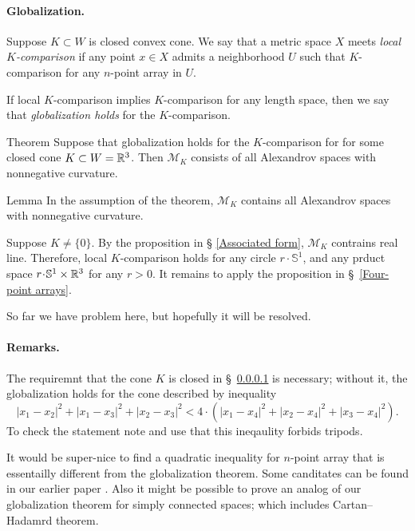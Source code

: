 \documentclass[a4paper,10pt]{article}
\begin{document}
\paragraph{Globalization.}\label{par:globalization}
Suppose $K\subset W$ is closed convex cone.
We say that a metric space $X$ meets \emph{local $K$-comparison} if any point $x\in X$ admits a neighborhood $U$ such that $K$-comparison for any $n$-point array in $U$.

If local $K$-comparison implies $K$-comparison for any length space, then we say that \emph{globalization holds} for the $K$-comparison.

\begin{thm}{Theorem}
Suppose that globalization holds for the $K$-comparison for for some closed cone $K\subset W=\mathbb{R}^3$.
Then $\mathcal{M}_K$ consists of all Alexandrov spaces with nonnegative curvature.
\end{thm}

\begin{thm}{Lemma}
In the assumption of the theorem, $\mathcal{M}_K$ contains all Alexandrov spaces with nonnegative curvature.
\end{thm}

Suppose $K\ne\{0\}$.
By the proposition in § \ref{Associated form}, $\mathcal{M}_K$ contrains real line.
Therefore, local $K$-comparison holds for any circle $r\cdot \mathbb{S}^1$, and any prduct space $r\cdot \mathbb{S}^1\times\RR^3$ for any $r>0$.
It remains to apply the proposition in §~\ref{Four-point arrays}.
\qeds

So far we have problem here, but hopefully it will be resolved.
\qeds

\paragraph{Remarks.}
The requiremnt that the cone $K$ is closed in §~\ref{par:globalization} is necessary;
without it, the globalization holds for the cone described by inequality
\[|x_1-x_2|^2+|x_1-x_3|^2+|x_2-x_3|^2<4\cdot(|x_1-x_4|^2+|x_2-x_4|^2+|x_3-x_4|^2).\]
To check the statement note and use that this ineqaulity forbids tripods.

It would be super-nice to find a quadratic inequality for $n$-point array that is essentailly different from the globalization theorem.
Some canditates can be found in our earlier paper \cite{lebedeva-petrunin-zolotov}.
Also it might be possible to prove an analog of our globalization theorem for simply connected spaces; which includes Cartan--Hadamrd theorem.

{\sloppy
\def\emph{\textit}
\printbibliography[heading=bibintoc]
\fussy
}
\end{document}
